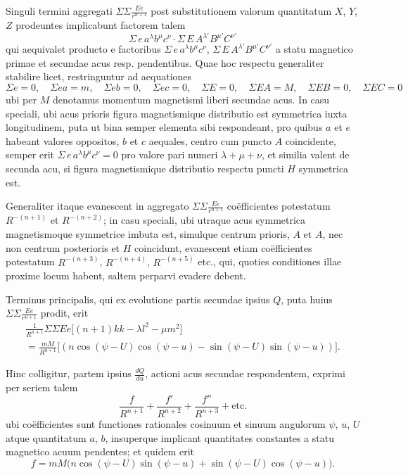 \documentclass[fontsize=11pt,paper=a4,twoside,openany]{scrbook}
\begin{document}
Singuli termini aggregati $\Sigma\Sigma\frac{Ee}{r^{n+1}}$ post substitutionem valorum quantitatum $X$, $Y$, $Z$ prodeuntes implicabunt factorem talem
\[
\Sigma\,e\,a^{\lambda}b^{\mu}c^{\nu}\cdot\Sigma\,E\,A^{\lambda'}B^{\mu'}C^{\nu'}
\]
qui aequivalet producto e factoribus $\Sigma\,e\,a^{\lambda}b^{\mu}c^{\nu}$, $\Sigma\,E\,A^{\lambda'}B^{\mu'}C^{\nu'}$ a statu magnetico primae et secundae acus resp. pendentibus. Quae hoc respectu generaliter stabilire licet, restringuntur ad aequationes
\[
\Sigma e = 0,\quad \Sigma e a = m,\quad \Sigma e b = 0,\quad \Sigma e c = 0,\quad \Sigma E = 0,\quad \Sigma EA = M,\quad \Sigma EB = 0,\quad \Sigma EC = 0
\]
ubi per $M$ denotamus momentum magnetismi liberi secundae acus. In casu speciali, ubi acus prioris figura magnetismique distributio est symmetrica iuxta longitudinem, puta ut bina semper elementa sibi respondeant, pro quibus $a$ et $e$ habeant valores oppositos, $b$ et $c$ aequales, centro cum puncto $A$ coincidente, semper erit $\Sigma\,e\,a^{\lambda}b^{\mu}c^{\nu}=0$ pro valore pari numeri $\lambda+\mu+\nu$, et similia valent de secunda acu, si figura magnetismique distributio respectu puncti $H$ symmetrica est.

Generaliter itaque evanescent in aggregato $\Sigma\Sigma\frac{Ee}{r^{n+1}}$ coëfficientes potestatum $R^{-(n+1)}$ et $R^{-(n+2)}$; in casu speciali, ubi utraque acus symmetrica magnetismoque symmetrice imbuta est, simulque centrum prioris, $A$ et $A$, nec non centrum posterioris et $H$ coincidunt, evanescent etiam coëfficientes potestatum $R^{-(n+3)}$, $R^{-(n+4)}$, $R^{-(n+5)}$ etc., qui, quoties conditiones illae proxime locum habent, saltem perparvi evadere debent.

Terminus principalis, qui ex evolutione partis secundae ipsius $Q$, puta huius $\Sigma\Sigma\frac{Ee}{r^{n+1}}$ prodit, erit
\begin{multline*}
\frac{1}{R^{n+1}}\Sigma\Sigma Ee\bigl[(n+1)k k - \lambda l^2 - \mu m^2\bigr]\\
= \frac{mM}{R^{n+1}}\bigl[(n\cos(\psi-U)\cos(\psi-u) - \sin(\psi-U)\sin(\psi-u))\bigr].
\end{multline*}

Hinc colligitur, partem ipsius $\frac{dQ}{du}$, actioni acus secundae respondentem, exprimi per seriem talem
\[
\frac{f}{R^{n+1}} + \frac{f'}{R^{n+2}} + \frac{f''}{R^{n+3}} + \text{etc.}
\]
ubi coëfficientes sunt functiones rationales cosinuum et sinuum angulorum $\psi$, $u$, $U$ atque quantitatum $a$, $b$, insuperque implicant quantitates constantes a statu magnetico acuum pendentes; et quidem erit
\[
f = mM\bigl(n\cos(\psi-U)\sin(\psi-u) + \sin(\psi-U)\cos(\psi-u)\bigr).
\]
\end{document}
